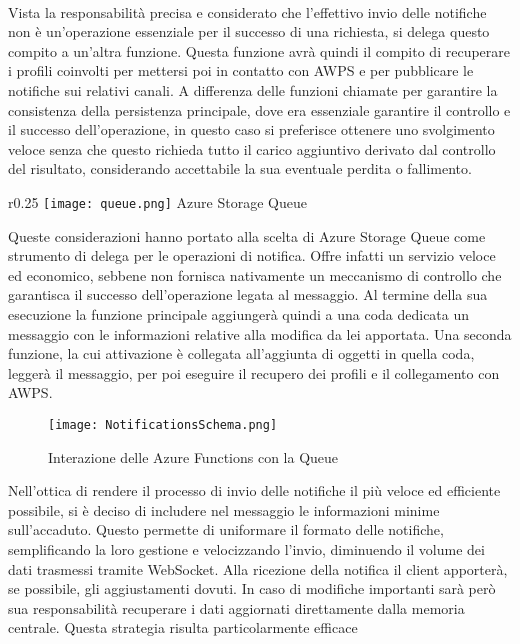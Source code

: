 \\
Vista la responsabilità precisa e considerato che 
l'effettivo invio delle notifiche non è un'operazione essenziale 
per il successo di una richiesta,
si delega questo compito a un'altra funzione.
Questa funzione avrà quindi il compito di recuperare i profili coinvolti
per mettersi poi in contatto con AWPS e per pubblicare le notifiche sui relativi canali.
A differenza delle funzioni chiamate per garantire la consistenza della persistenza principale,
dove era essenziale garantire il controllo e il successo dell'operazione, 
in questo caso si preferisce ottenere uno svolgimento veloce senza 
che questo richieda tutto il carico aggiuntivo derivato dal controllo del risultato,
considerando accettabile la sua eventuale perdita o fallimento.\\
\begin{wrapfigure}{r}{0.25\textwidth}
    \centering
    \texttt{[image: queue.png]}
    Azure Storage Queue
\end{wrapfigure}
Queste considerazioni hanno portato alla scelta di Azure Storage Queue
come strumento di delega per le operazioni di notifica.
Offre infatti un servizio veloce ed economico, 
sebbene non fornisca nativamente un meccanismo di controllo 
che garantisca il successo dell'operazione legata al messaggio.
Al termine della sua esecuzione la funzione principale aggiungerà quindi
a una coda dedicata un messaggio con le informazioni relative 
alla modifica da lei apportata.
Una seconda funzione, la cui attivazione è collegata all'aggiunta di oggetti in quella coda,
leggerà il messaggio, per poi eseguire il recupero dei profili e il collegamento con AWPS.\\
\begin{figure}[htpb]
    \centering
    \texttt{[image: NotificationsSchema.png]}
    \caption{Interazione delle Azure Functions con la Queue}
\end{figure}
\clearpage
Nell'ottica di rendere il processo di invio delle notifiche 
il più veloce ed efficiente possibile, 
si è deciso di includere nel messaggio le informazioni minime sull'accaduto.
Questo permette di uniformare il formato delle notifiche, 
semplificando la loro gestione e velocizzando l'invio,
diminuendo il volume dei dati trasmessi tramite WebSocket.
Alla ricezione della notifica il client apporterà, se possibile,
gli aggiustamenti dovuti.
In caso di modifiche importanti sarà però sua responsabilità 
recuperare i dati aggiornati direttamente dalla memoria centrale.
Questa strategia risulta particolarmente efficace 
